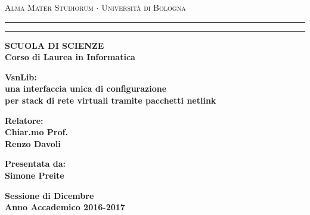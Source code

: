 \documentclass[14pt,a4paper,openright,twoside]{extreport}
\begin{document}
\begin{titlepage}
\begin{center}
{{\Large{\textsc{Alma Mater Studiorum $\cdot$ Universit\`a di
Bologna}}}} \rule[0.1cm]{15.8cm}{0.1mm}
\rule[0.5cm]{15.8cm}{0.6mm}
{\small{\bf SCUOLA DI SCIENZE\\
Corso di Laurea in Informatica }}
\end{center}
\vspace{15mm}
\begin{center}
{\LARGE{\bf VsnLib:}}\\
\vspace{3mm}
{\LARGE{\bf una interfaccia unica di configurazione}}\\
{\LARGE{\bf per stack di rete virtuali tramite pacchetti netlink}}\\
\end{center}
\vspace{40mm}
\par
\noindent
\begin{minipage}[t]{0.47\textwidth}
{\large{\bf Relatore:\\
Chiar.mo Prof.\\
Renzo Davoli}}
\end{minipage}
\hfill
\begin{minipage}[t]{0.47\textwidth}\raggedleft
{\large{\bf Presentata da:\\
Simone Preite}}
\end{minipage}
\vspace{20mm}
\begin{center}
{\large{\bf Sessione di Dicembre\\%
Anno Accademico 2016-2017}}%
\end{center}
\end{titlepage}
\end{document}

